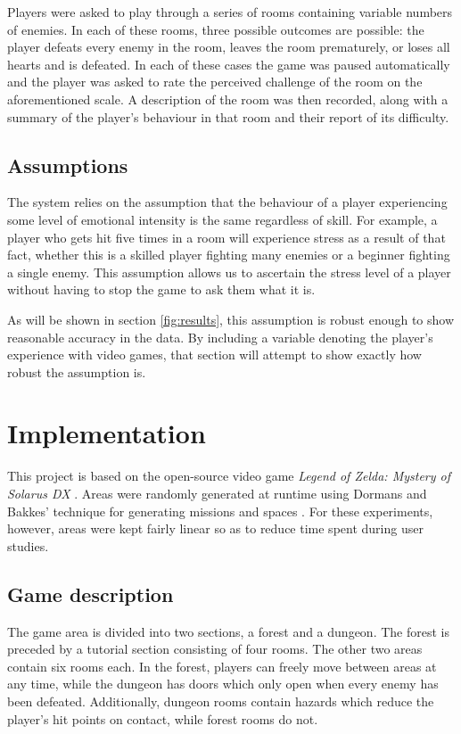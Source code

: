 \documentclass[a4paper]{article}
\begin{document}
\begin{multicols*}{2}
Players were asked to play through a series of rooms containing variable numbers of enemies. In each of these rooms, three possible outcomes are possible: the player  defeats every enemy in the room, leaves the room prematurely, or loses all hearts and is defeated. In each of these cases the game was paused automatically and the player was asked to rate the perceived challenge of the room on the aforementioned scale. A description of the room was then recorded, along with a summary of the player's behaviour in that room and their report of its difficulty.

\subsection{Assumptions}
The system relies on the assumption that the behaviour of a player experiencing some level of emotional intensity is the same regardless of skill. For example, a player who gets hit five times in a room will experience stress as a result of that fact, whether this is a skilled player fighting many enemies or a beginner fighting a single enemy. This assumption allows us to ascertain the stress level of a player without having to stop the game to ask them what it is.

As will be shown in section \ref{fig:results}, this assumption is robust enough to show reasonable accuracy in the data. By including a variable denoting the player's experience with video games, that section will attempt to show exactly how robust the assumption is.

\section{Implementation}
This project is based on the open-source video game \emph{Legend of Zelda: Mystery of Solarus DX} \cite{zeldasolarus}. Areas were randomly generated at runtime using Dormans and Bakkes' technique for generating missions and spaces \cite{missiongrammar}. For these experiments, however, areas were kept fairly linear so as to reduce time spent during user studies. 

\subsection{Game description}
The game area is divided into two sections, a forest and a dungeon. The forest is preceded by a tutorial section consisting of four rooms. The other two areas contain six rooms each. In the forest, players can freely move between areas at any time, while the dungeon has doors which only open when every enemy has been defeated. Additionally, dungeon rooms contain hazards which reduce the player's hit points on contact, while forest rooms do not.


\end{multicols*}
\end{document}
